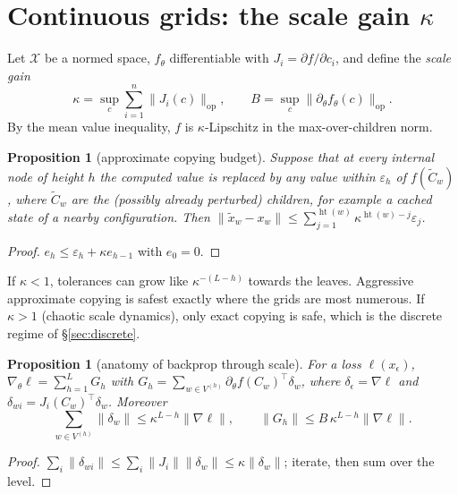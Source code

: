 \documentclass[11pt]{article}
\newtheorem{proposition}[theorem]{Proposition}
\theoremstyle{definition}
\newcommand{\hgt}{\operatorname{ht}}
\newcommand{\eps}{\varepsilon}
\newcommand{\cX}{\mathcal{X}}
\newcommand{\norm}[1]{\lVert #1\rVert}
\begin{document}
\section{Continuous grids: the scale gain \texorpdfstring{$\kappa$}{kappa}}\label{sec:cont}
Let $\cX$ be a normed space, $f_\theta$ differentiable with $J_i=\partial f/\partial c_i$, and
define the \emph{scale gain}
\[
\kappa=\sup_{c}\sum_{i=1}^{n}\norm{J_i(c)}_{\mathrm{op}},\qquad
B=\sup_c\norm{\partial_\theta f_\theta(c)}_{\mathrm{op}} .
\]
By the mean value inequality, $f$ is $\kappa$-Lipschitz in the max-over-children norm.

\begin{proposition}[approximate copying budget]\label{prop:copy}
Suppose that at every internal node of height $h$ the computed value is replaced by any value
within $\eps_h$ of $f(\tilde C_w)$, where $\tilde C_w$ are the (possibly already perturbed)
children, for example a cached state of a nearby configuration. Then
$\norm{\tilde x_w-x_w}\le\sum_{j=1}^{\hgt(w)}\kappa^{\hgt(w)-j}\eps_j$.
\end{proposition}
\begin{proof}$e_h\le\eps_h+\kappa e_{h-1}$ with $e_0=0$.\end{proof}
\noindent If $\kappa<1$, tolerances can grow like $\kappa^{-(L-h)}$ towards the leaves.
Aggressive approximate copying is safest exactly where the grids are most numerous. If
$\kappa>1$ (chaotic scale dynamics), only exact copying is safe, which is the discrete regime of
\S\ref{sec:discrete}.

\begin{proposition}[anatomy of backprop through scale]\label{prop:grad}
For a loss $\ell(x_\epsilon)$, $\nabla_\theta\ell=\sum_{h=1}^{L}G_h$ with
$G_h=\sum_{w\in V^{(h)}}\partial_\theta f(C_w)^{\!\top}\delta_w$, where
$\delta_\epsilon=\nabla\ell$ and $\delta_{wi}=J_i(C_w)^{\!\top}\delta_w$. Moreover
\[
\sum_{w\in V^{(h)}}\norm{\delta_w}\le\kappa^{L-h}\norm{\nabla\ell},\qquad
\norm{G_h}\le B\,\kappa^{L-h}\norm{\nabla\ell}.
\]
\end{proposition}
\begin{proof}$\sum_i\norm{\delta_{wi}}\le\sum_i\norm{J_i}\norm{\delta_w}\le\kappa\norm{\delta_w}$;
iterate, then sum over the level.\end{proof}
\end{document}
